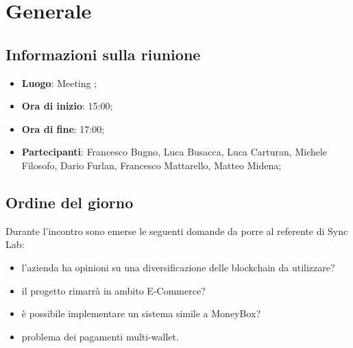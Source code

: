 \section{Generale}

\vspace{10pt}


\subsection{Informazioni sulla riunione}
\begin{itemize}
	\item \textbf{Luogo}: Meeting \glo{};
	\item \textbf{Ora di inizio}: 15:00;
	\item \textbf{Ora di fine}: 17:00;
	\item \textbf{Partecipanti}: Francesco Bugno, Luca Busacca, Luca Carturan, Michele Filosofo, Dario Furlan, Francesco Mattarello, Matteo Midena;
\end{itemize}

\vspace{5pt}

\subsection{Ordine del giorno}
Durante l'incontro sono emerse le seguenti domande da porre al referente di Sync Lab:
\begin{itemize}
	\item l'azienda ha opinioni su una diversificazione delle blockchain\glo{} da utilizzare?
	\item il progetto rimarrà in ambito E-Commerce\glo?
	\item è possibile implementare un sistema simile a MoneyBox\glo?
	\item problema dei pagamenti multi-wallet\glo.
\end{itemize}
